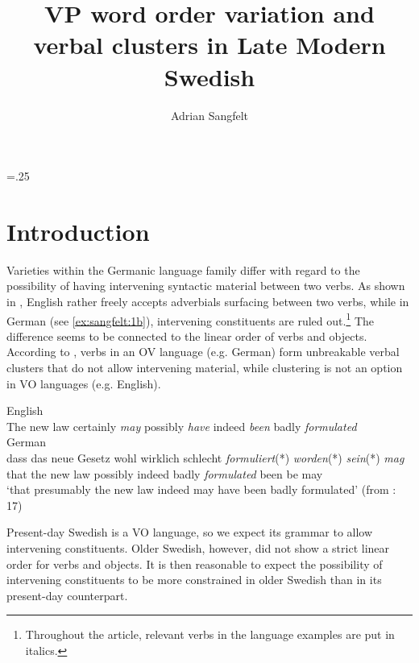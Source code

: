 \documentclass[output=paper, colorlinks, citecolor=brown]{langscibook}
\author{Adrian Sangfelt\affiliation{Uppsala University}}
\title{VP word order variation and verbal clusters in Late Modern Swedish}
\begin{document}
\multicolsep=.25\baselineskip
\maketitle 


\section{Introduction}\label{sec:sangfelt:1}

Varieties within the Germanic language family differ with regard to the possibility of having intervening syntactic material between two verbs. As shown in , English rather freely accepts adverbials surfacing between two verbs, while in German (see \ref{ex:sangfelt:1b}), intervening constituents are ruled out.\footnote{Throughout the article, relevant verbs in the language examples are put in italics.} The difference seems to be connected to the linear order of verbs and objects. According to \citet[17–19, 33–35, 287–293]{Haider2010}, verbs in an OV language (e.g. German) form unbreakable verbal clusters that do not allow intervening material, while clustering is not an option in VO languages (e.g. English).

\ea
\label{ex:sangfelt:1}
\ea English\label{ex:sangfelt:1a}\\
The new law {certainly} \textit{may} {possibly} \textit{have} {indeed} \textit{been} {badly} \textit{formulated} \\
\ex German\label{ex:sangfelt:1b}\\
\gll dass das neue Gesetz {wohl} {wirklich} {schlecht} \textit{formuliert}(*) \textit{worden}(*) \textit{sein}(*) \textit{mag} \\
that the new law possibly indeed badly \textit{formulated} been be may \\
\glt ‘that presumably the new law indeed may have been badly formulated’ (from \citealt{Haider2010}: 17)
\z
\z 


Present-day Swedish is a VO language, so we expect its grammar to allow intervening constituents. Older Swedish, however, did not show a strict linear order for verbs and objects. It is then reasonable to expect the possibility of intervening constituents to be more constrained in older Swedish than in its present-day counterpart.
\end{document}
